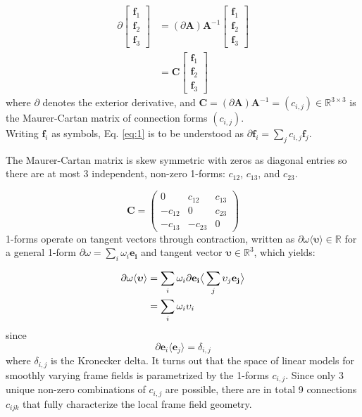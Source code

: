 \begin{align} \label{eq:1}
    \partial \begin{bmatrix}
                \mathbf{f}_1 \\
                \mathbf{f}_2 \\
                \mathbf{f}_3
            \end{bmatrix} &= (\partial \mathbf{A})\mathbf{A}^{-1}  \begin{bmatrix}
                \mathbf{f}_1 \\
                \mathbf{f}_2 \\
                \mathbf{f}_3
            \end{bmatrix} \\
            &= \mathbf{C}
            \begin{bmatrix}
                \mathbf{f}_1 \\
                \mathbf{f}_2 \\
                \mathbf{f}_3
            \end{bmatrix}
\end{align}
where $\partial$ denotes the exterior derivative, and $\mathbf{C} = (\partial \mathbf{A}) \mathbf{A}^{-1} = (c_{i,j}) \in \mathbb{R}^{3 \times 3}$ is the Maurer-Cartan matrix of connection forms $(c_{i,j})$.\\
Writing $\mathbf{f}_i$ as symbols, Eq. \ref{eq:1} is to be understood as $\partial \mathbf{f}_i = \sum_j{c_{i,j}\mathbf{f}_j}$.

The Maurer-Cartan matrix is skew symmetric with zeros as diagonal entries so there are at most 3 independent, non-zero 1-forms: $c_{12}$, $c_{13}$, and $c_{23}$.

\begin{equation}
    \mathbf{C} = \begin{pmatrix}
    0 & c_{12} & c_{13} \\
    -c_{12} & 0 & c_{23} \\
    -c_{13} & -c_{23} & 0
    \end{pmatrix}
\end{equation}
1-forms operate on tangent vectors through contraction, written as $\partial \omega \langle \boldsymbol{\upsilon} \rangle \in \mathbb{R}$ for a general 1-form $\partial \omega = \sum_i{\omega_i \mathbf{e_i}}$ and tangent vector $\boldsymbol{\upsilon} \in \mathbb{R}^3$, which yields:

\begin{align}
    \partial \omega \langle \boldsymbol{\upsilon} \rangle &= \sum_i{\omega_i \partial \mathbf{e_i}} \big{\langle} \sum_j{\upsilon_j \mathbf{e_j}} \big{\rangle} \\
    &= \sum_i{\omega_i \upsilon_i}
\end{align}
since
\begin{equation}
    \partial \mathbf{e}_i \langle \mathbf{e}_j \rangle = \delta_{i,j}
\end{equation}
where $\delta_{i,j}$ is the Kronecker delta.
It turns out that the space of linear models for smoothly varying frame fields is parametrized by the 1-forms $c_{i,j}$. Since only 3 unique non-zero combinations of $c_{i,j}$ are possible, there are in total 9 connections $c_{ijk}$ that fully characterize the local frame field geometry.

